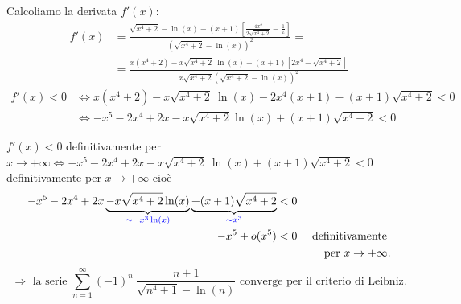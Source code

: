 \begin{exbar}
\begin{example}
	Calcoliamo la derivata $f'(x)$:
	\begin{align*}
		f'(x)
		&= \frac{\sqrt{x^4 + 2} - \ln(x) - (x + 1) \left[ \frac{4 x^3 } {2 \sqrt{x^4 + 2}} - \frac{1}{x} \right]} {\left( 
			\sqrt{x^4 + 2} - \ln(x) \right)^2} = 
		\\
		&= \frac{x (x^4 + 2) - x \sqrt{x^4 + 2} \ \ln(x) - (x + 1) \left[2x ^ 4 - \sqrt{x^4 + 2} \right] } {x \sqrt{x^4 + 2} \left( \sqrt{x^4 + 2} - \ln(x) \right)^2}
	\end{align*}
	\begin{align*}
		f'(x)<0 
		& \iff x (x^4 + 2) - x \sqrt{x^4 + 2} \ \ln(x) - 2x^4 (x + 1) - (x + 1) \sqrt{x^4 + 2}  < 0
		\\
		&\iff -x^5 - 2x^4 + 2x - x\sqrt{x^4+2} \ln(x) + (x + 1) \sqrt{x^4 + 2} < 0
	\end{align*}
	
	$f'(x)<0$ definitivamente per $x \rightarrow +\infty \iff -x^5 - 2x^4 + 2x - x \sqrt{x^4 + 2} \ \ln(x) + (x+1) \sqrt{x^4 + 2} < 0$ definitivamente per $x\rightarrow+\infty$ cioè
	\begin{align*}
		-x^5 - 2x^4 + 2x \underbrace{- x\sqrt{x^4 + 2} \ln(x)}_{\color{blue}{\sim -x^3 \ln(x)}} \underbrace{+ (x + 1) \sqrt{x^4 + 2}}_{\color{blue}{\sim x^3}} &< 0 
		\\
		-x^5 + o(x^5) &< 0 &\text{ definitivamente } 
		\\
		& & \text{per } x\rightarrow +\infty.
	\end{align*}
	\begin{equation*}
		\Rightarrow \text{ la serie } \sum_{n=1}^{\infty} (-1)^n \ \frac{n+1} {\sqrt{n^4 + 1} - \ln(n)} \text{ converge per il criterio di Leibniz.}
	\end{equation*}
\end{example}
\end{exbar}


